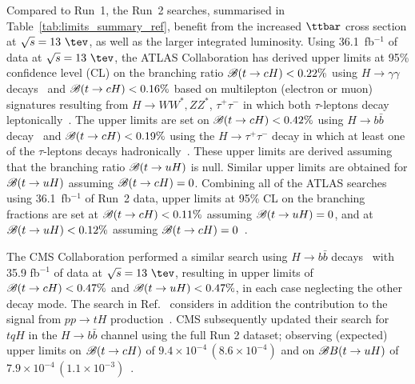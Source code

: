 Compared to Run~1, the Run~2 searches, summarised in Table~\ref{tab:limits_summary_ref}, benefit from the increased $\ttbar$ cross section at $\sqrt{s}=13~\tev$, as well as the larger integrated luminosity.
Using 36.1~fb$^{-1}$ of data at $\sqrt{s}=13~\tev$, the ATLAS Collaboration has derived upper limits at 95\% confidence level (CL) on the branching ratio
$\mathscr{B}(t\to cH)<0.22\%$ using $H\to \gamma\gamma$ decays~\cite{Aaboud:2017mfd} and $\mathscr{B}(t\to cH)<0.16\%$ based on
multilepton (electron or muon) signatures resulting from 
$H \to  WW^*, ZZ^*$, $\tau^+\tau^-$ in which both $\tau$-leptons decay leptonically~\cite{Aaboud:2018pob}.
The upper limits are set on $\mathscr{B}(t\to cH)<0.42\%$ using $H\to b\bar{b}$ decay~\cite{fcnc36} and $\mathscr{B}(t\to cH)<0.19\%$ using the $H\to \tau^+\tau^-$ decay in which at least
one of the $\tau$-leptons decays hadronically~\cite{fcnc36}.  
These upper limits are derived assuming that the branching ratio $\mathscr{B}(t\to uH)$ is null. Similar upper limits are obtained for $\mathscr{B}(t\to uH)$ assuming $\mathscr{B}(t\to cH)=0$.
Combining all of the ATLAS searches using 36.1~fb$^{-1}$ of Run~2 data, upper limits at 95\% CL on the branching fractions are 
set at $\mathscr{B}(t\to cH)<0.11\%$ assuming $\mathscr{B}(t\to uH)=0$, and at $\mathscr{B}(t\to uH)<0.12\%$ assuming $\mathscr{B}(t\to cH)=0$~\cite{fcnc36}.

The CMS Collaboration performed a similar search using  
$H\to b\bar{b}$ decays~\cite{Sirunyan:2017uae} with 35.9 fb$^{-1}$ of data at $\sqrt{s}=13~\tev$, resulting 
in upper limits of $\mathscr{B}(t\to cH)<0.47\%$ and $\mathscr{B}(t\to uH)<0.47\%$, in each case neglecting the other decay mode.
The search in Ref.~\cite{Sirunyan:2017uae} considers in addition the contribution to the signal from 
$pp \to tH$ production~\cite{Greljo:2014dka}. 
CMS subsequently updated their search for $tqH$ in the $H\to b\bar{b}$ channel using
the full Run 2 dataset; observing (expected) upper limits on  $\mathscr{B}(t\to cH)$ of $9.4\times10^{-4}\, (8.6\times10^{-4})$
and on $\mathscr{B}{B}(t\to uH)$ of $7.9\times10^{-4}\, (1.1\times10^{-3})$~\cite{CMS:2021gfa}.


